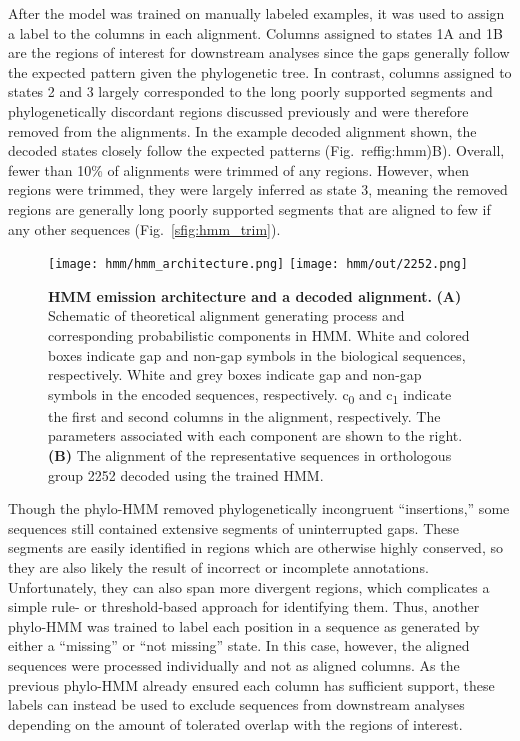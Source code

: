 After the model was trained on manually labeled examples, it was used to assign a label to the columns in each alignment. Columns assigned to states 1A and 1B are the regions of interest for downstream analyses since the gaps generally follow the expected pattern given the phylogenetic tree. In contrast, columns assigned to states 2 and 3 largely corresponded to the long poorly supported segments and phylogenetically discordant regions discussed previously and were therefore removed from the alignments. In the example decoded alignment shown, the decoded states closely follow the expected patterns (Fig.~ref{fig:hmm})B). Overall, fewer than 10\% of alignments were trimmed of any regions. However, when regions were trimmed, they were largely inferred as state 3, meaning the removed regions are generally long poorly supported segments that are aligned to few if any other sequences (Fig.~\ref{sfig:hmm_trim}).

\begin{figure}[h!]
\texttt{[image: hmm/hmm\_architecture.png]}
\texttt{[image: hmm/out/2252.png]}
\centering
\caption{\textbf{HMM emission architecture and a decoded alignment.}
\textbf{(A)} Schematic of theoretical alignment generating process and corresponding probabilistic components in HMM. White and colored boxes indicate gap and non-gap symbols in the biological sequences, respectively. White and grey boxes indicate gap and non-gap symbols in the encoded sequences, respectively. c\textsubscript{0} and c\textsubscript{1} indicate the first and second columns in the alignment, respectively. The parameters associated with each component are shown to the right. \textbf{(B)} The alignment of the representative sequences in orthologous group 2252 decoded using the trained HMM.}
\label{fig:hmm}
\end{figure}

Though the phylo-HMM removed phylogenetically incongruent ``insertions,'' some sequences still contained extensive segments of uninterrupted gaps. These segments are easily identified in regions which are otherwise highly conserved, so they are also likely the result of incorrect or incomplete annotations. Unfortunately, they can also span more divergent regions, which complicates a simple rule- or threshold-based approach for identifying them. Thus, another phylo-HMM was trained to label each position in a sequence as generated by either a ``missing'' or ``not missing'' state. In this case, however, the aligned sequences were processed individually and not as aligned columns. As the previous phylo-HMM already ensured each column has sufficient support, these labels can instead be used to exclude sequences from downstream analyses depending on the amount of tolerated overlap with the regions of interest.

